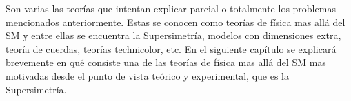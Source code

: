 
Son varias las teorías que intentan explicar parcial o totalmente los problemas
mencionados anteriormente. Estas se conocen como teorías de física mas allá del SM y entre
ellas se encuentra la Supersimetría, modelos con dimensiones extra, teoría de
cuerdas, teorías technicolor, etc. En el siguiente capítulo se explicará brevemente
en qué consiste una de las teorías de física mas allá del SM mas motivadas desde
el punto de vista teórico y experimental, que es la Supersimetría.
